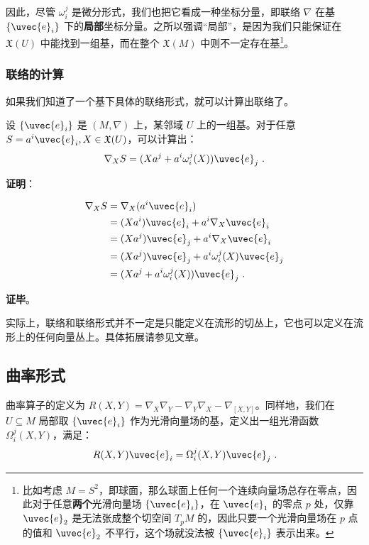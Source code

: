 因此，尽管 $\omega_i^j$ 是微分形式，我们也把它看成一种坐标分量，即联络 $\nabla$ 在基 $\{\uvec{e}_i\}$ 下的\textbf{局部}坐标分量。之所以强调“局部”，是因为我们只能保证在 $\mathfrak{X}(U)$ 中能找到一组基，而在整个 $\mathfrak{X}(M)$ 中则不一定存在基\footnote{比如考虑 $M=S^2$，即球面，那么球面上任何一个连续向量场总存在零点，因此对于任意\textbf{两个}光滑向量场 $\{\uvec{e}_i\}$，在 $\uvec{e}_1$ 的零点 $p$ 处，仅靠 $\uvec{e}_2$ 是无法张成整个切空间 $T_pM$ 的，因此只要一个光滑向量场在 $p$ 点的值和 $\uvec{e}_2$ 不平行，这个场就没法被 $\{\uvec{e}_i\}$ 表示出来。}。

\subsubsection{联络的计算}

如果我们知道了一个基下具体的联络形式，就可以计算出联络了。

\begin{theorem}{}
设 $\{\uvec{e}_i\}$ 是 $(M, \nabla)$ 上，某邻域 $U$ 上的一组基。对于任意 $S=a^i\uvec{e}_i, X\in\mathfrak{X}(U)$，可以计算出：
\begin{equation}
\nabla_XS=(Xa^j+a^i\omega^j_i(X))\uvec{e}_j~.
\end{equation}
\end{theorem}

\textbf{证明}：

\begin{equation}
\begin{aligned}
\nabla_XS&=\nabla_X(a^i\uvec{e}_i)\\
&=(Xa^i)\uvec{e}_i+a^i\nabla_X\uvec{e}_i\\
&=(Xa^j)\uvec{e}_j+a^i\nabla_X\uvec{e}_i\\
&=(Xa^j)\uvec{e}_j+a^i\omega^j_i(X)\uvec{e}_j\\
&=(Xa^j+a^i\omega^j_i(X))\uvec{e}_j~.
\end{aligned}
\end{equation}

\textbf{证毕}。

实际上，联络和联络形式并不一定是只能定义在流形的切丛上，它也可以定义在流形上的任何向量丛上。具体拓展请参见文章。

\subsection{曲率形式}

曲率算子的定义为 $R(X, Y)=\nabla_X\nabla_Y-\nabla_Y\nabla_X-\nabla_{[X, Y]}$。同样地，我们在 $U\subseteq M$ 局部取 $\{\uvec{e}_i\}$ 作为光滑向量场的基，定义出一组光滑函数 $\Omega^j_i(X, Y)$，满足：
\begin{equation}\label{eq_ConFom_1}
R(X, Y)\uvec{e}_i=\Omega^j_i(X, Y)\uvec{e}_j~.
\end{equation}

